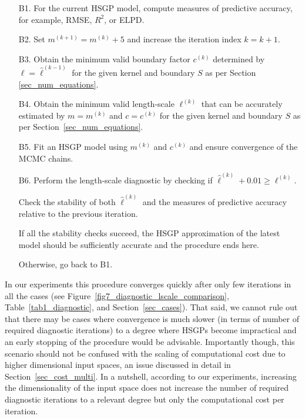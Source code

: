 \begin{enumerate}

\item[B1.] For the current HSGP model, compute measures of predictive accuracy, for example, RMSE, $R^2$, or ELPD.

\item[B2.] Set $m^{(k+1)} = m^{(k)} + 5$ and increase the iteration index $k = k + 1$.

\item[B3.] Obtain the minimum valid boundary factor $c^{(k)}$ determined by $\ell = \hat{\ell}^{(k-1)}$ for the given kernel and boundary $S$ as per Section \ref{sec_num_equations}.

\item[B4.] Obtain the minimum valid length-scale $\ell^{(k)}$ that can be accurately estimated by $m = m^{(k)}$ and $c = c^{(k)}$ for the given kernel and boundary $S$ as per Section~\ref{sec_num_equations}.

\item[B5.] Fit an HSGP model using $m^{(k)}$ and $c^{(k)}$ and ensure convergence of the MCMC chains.

\item[B6.] Perform the length-scale diagnostic by checking if $\hat{\ell}^{(k)} + 0.01 \geq \ell^{(k)}$. 

Check the stability of both $\hat{\ell}^{(k)}$ and the measures of predictive accuracy relative to the previous iteration.

If all the stability checks succeed, the HSGP approximation of the latest model should be sufficiently accurate and the procedure ends here.

Otherwise, go back to B1.
\end{enumerate}

{\color{blue} In our experiments this procedure converges quickly after only few iterations in all the cases (see Figure~\ref{fig7_diagnostic_lscale_comparison}, Table~\ref{tab1_diagnostic}, and Section~\ref{sec_cases}). That said, we cannot rule out that there may be cases where convergence is much slower (in terms of number of required diagnostic iterations) to a degree where HSGPs become impractical and an early stopping of the procedure would be advisable.
Importantly though, this scenario should not be confused with the scaling of computational cost due to higher dimensional input spaces, an issue discussed in detail in Section~\ref{sec_cost_multi}. In a nutshell, according to our experiments, increasing the dimensionality of the input space does not increase the number of required diagnostic iterations to a relevant degree but only the computational cost per iteration.}


